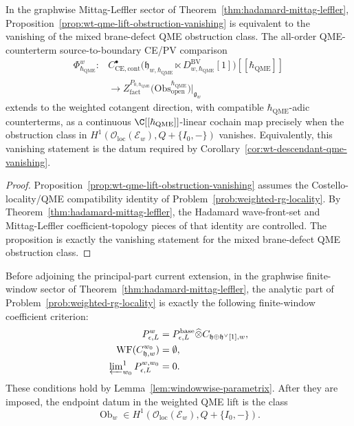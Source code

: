 \begin{cor}\label{cor:wt-cotangent-lift-hadamard-criterion}
  In the graphwise Mittag-Leffler sector of
  Theorem~\ref{thm:hadamard-mittag-leffler},
  Proposition~\ref{prop:wt-qme-lift-obstruction-vanishing} is equivalent to the
  vanishing of the mixed brane-defect QME obstruction class.  The
  all-order QME-counterterm source-to-boundary CE/PV comparison
  \[
  \begin{aligned}
    \Phi_{\hbar_{\mathrm{QME}}}^{w}\colon
    &C^\bullet_{\mathrm{CE},\mathrm{cont}}\bigl(
      \mathfrak h_{w,\hbar_{\mathrm{QME}}}\ltimes
      D^{\mathrm{BV}}_{w,\hbar_{\mathrm{QME}}}[1]\bigr)[[\hbar_{\mathrm{QME}}]]\\
    &\longrightarrow
      Z^{P_{0,\hbar_{\mathrm{QME}}}}_{\mathrm{fact}}\bigl(
      \mathrm{Obs}^{\hbar_{\mathrm{QME}}}_{\mathrm{open}}\bigr)\big|_{\mathfrak g_w}
  \end{aligned}
  \]
  extends to the weighted cotangent direction, with compatible
  \(\hbar_{\mathrm{QME}}\)-adic counterterms, as a continuous
  \(\C[[\hbar_{\mathrm{QME}}]]\)-linear cochain map precisely when the obstruction class in
  \(H^1(\mathcal O_{\mathrm{loc}}(\mathcal E_w),Q+\{I_0,-\})\)
  vanishes.  Equivalently, this vanishing statement is the datum required
  by Corollary~\ref{cor:wt-descendant-qme-vanishing}.
\end{cor}

\begin{proof}
  Proposition~\ref{prop:wt-qme-lift-obstruction-vanishing} assumes the
  Costello-locality/QME compatibility identity of
  Problem~\ref{prob:weighted-rg-locality}. By
  Theorem~\ref{thm:hadamard-mittag-leffler}, the Hadamard
  wave-front-set and Mittag-Leffler coefficient-topology pieces of
  that identity are controlled.  The proposition is exactly the
  vanishing statement for the mixed brane-defect QME obstruction class.
\end{proof}

\begin{thm}\label{thm:weighted-rg-locality-reduced}
  Before adjoining the principal-part current extension, in the graphwise
  finite-window sector of
  Theorem~\ref{thm:hadamard-mittag-leffler}, the analytic part of
  Problem~\ref{prob:weighted-rg-locality} is exactly the following
  finite-window coefficient criterion:
  \[
  \begin{aligned}
    P_{\epsilon,L}^{w}
      &=P_{\epsilon,L}^{\mathrm{base}}\widehat\otimes
        C_{\mathfrak h\oplus\mathfrak h^\vee[1],w},\\
    \mathrm{WF}(C_{\mathfrak h,w}^{w_0})
      &=\emptyset,\\
    \varprojlim\nolimits^1_{w_0}P_{\epsilon,L}^{w,w_0}
      &=0.
  \end{aligned}
  \]
  These conditions hold by Lemma~\ref{lem:windowwise-parametrix}.  After
  they are imposed, the endpoint datum in the weighted QME lift is the
  class
  \[
    \operatorname{Ob}_{w}\in
    H^1(\mathcal O_{\mathrm{loc}}(\mathcal E_w),Q+\{I_0,-\}).
  \]
\end{thm}

